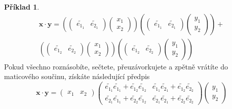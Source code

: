 \documentclass[a5paper,12pt]{amsbook}
\theoremstyle{definition}
\newtheorem{example}{Příklad}[chapter]
\newcommand{\myvec}[1]{\mathbf{#1}}
\begin{document}
\begin{example}
\begin{equation*}
\begin{split}
\myvec{x}\cdot\myvec{y} =
\left(
  \left(\begin{array}{cc}\widetilde{e_{1_1}} & \widetilde{e_{2_1}}\end{array}\right)
  \left(\begin{array}{c}x_1 \\ x_2\end{array}\right)
\right)
\left(
  \left(\begin{array}{cc}\widetilde{e_{1_1}} & \widetilde{e_{2_1}}\end{array}\right)
  \left(\begin{array}{c}y_1 \\ y_2\end{array}\right)
\right) + \\
\left(
  \left(\begin{array}{cc}\widetilde{e_{1_2}} & \widetilde{e_{2_2}}\end{array}\right)
  \left(\begin{array}{c}x_1 \\ x_2\end{array}\right)
\right)
\left(
  \left(\begin{array}{cc}\widetilde{e_{1_2}} & \widetilde{e_{2_2}}\end{array}\right)
  \left(\begin{array}{c}y_1 \\ y_2\end{array}\right)
\right)
\end{split}
\end{equation*}
Pokud všechno roznásobíte, sečtete, přeuzávorkujete a zpětně vrátíte do maticového
součinu, získáte následující předpis
\begin{equation*}
\myvec{x}\cdot\myvec{y} =
\left(\begin{array}{cc}x_1 & x_2\end{array}\right)
\left(\begin{array}{cc}
  \widetilde{e_{1_1}}\widetilde{e_{1_1}} + \widetilde{e_{1_2}}\widetilde{e_{1_2}} &
  \widetilde{e_{1_1}}\widetilde{e_{2_1}} + \widetilde{e_{1_2}}\widetilde{e_{2_2}} \\
  \widetilde{e_{2_1}}\widetilde{e_{1_1}} + \widetilde{e_{2_2}}\widetilde{e_{1_2}} &
  \widetilde{e_{2_1}}\widetilde{e_{2_1}} + \widetilde{e_{2_2}}\widetilde{e_{2_2}}
\end{array}\right)
\left(\begin{array}{c}y_1 \\ y_2\end{array}\right)
\end{equation*}

\end{example}
\end{document}
